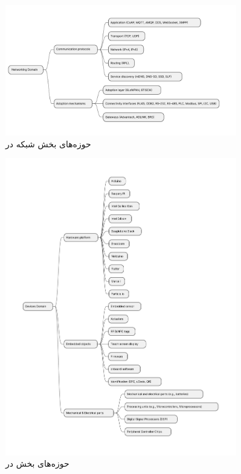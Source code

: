 \documentclass[a4paper]{article}
\begin{document}
\begin{figure}[H]
  \centering
  \includegraphics[width=0.9\textwidth]{./figures/IoT_network_domains.pdf}
  \caption{حوزه‌های بخش شبکه در }
  \label{fig:iotNetworkingDomains}
\end{figure}

\begin{figure}[H]
  \centering
  \includegraphics[width=0.9\textwidth]{./figures/IoT_devices_domains.pdf}
  \caption{حوزه‌های بخش  در }
  \label{fig:iotDevicesDomains}
\end{figure}
\end{document}

